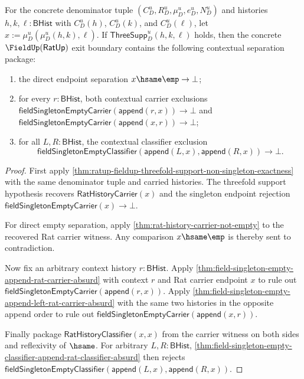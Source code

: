 \begin{theorem}
\label{thm:ratup-fieldup-threefold-support-contextual-separation-package}
For the concrete denominator tuple $(C_D^u,R_D^u,\mu_D^u,e_D^u,N_D^u)$ and
histories $h,k,\ell:\mathsf{BHist}$ with $C_D^u(h)$, $C_D^u(k)$, and
$C_D^u(\ell)$, let $x:=\mu_D^u(\mu_D^u(h,k),\ell)$. If
$\mathsf{ThreeSupp}_D^u(h,k,\ell)$ holds, then the concrete
$\FieldUp(\mathsf{RatUp})$ exit boundary contains the following contextual
separation package:
\begin{enumerate}
  \item the direct endpoint separation $x\hsame\emp\to\bot$;
  \item for every $r:\mathsf{BHist}$, both contextual carrier exclusions
  $\mathsf{fieldSingletonEmptyCarrier}(\mathsf{append}(r,x))\to\bot$ and
  $\mathsf{fieldSingletonEmptyCarrier}(\mathsf{append}(x,r))\to\bot$;
  \item for all $L,R:\mathsf{BHist}$, the contextual classifier exclusion
  $$
  \mathsf{fieldSingletonEmptyClassifier}(\mathsf{append}(L,x),\mathsf{append}(R,x))
  \to\bot.
  $$
\end{enumerate}
\end{theorem}
\begin{proof}
First apply
\autoref{thm:ratup-fieldup-threefold-support-non-singleton-exactness} with the
same denominator tuple and carried histories. The threefold support hypothesis
recovers $\mathsf{RatHistoryCarrier}(x)$ and the singleton endpoint rejection
$\mathsf{fieldSingletonEmptyCarrier}(x)\to\bot$.

For direct empty separation, apply \autoref{thm:rat-history-carrier-not-empty} to
the recovered Rat carrier witness. Any comparison $x\hsame\emp$ is thereby sent
to contradiction.

Now fix an arbitrary context history $r:\mathsf{BHist}$. Apply
\autoref{thm:field-singleton-empty-append-rat-carrier-absurd} with context $r$
and Rat carrier endpoint $x$ to rule out
$\mathsf{fieldSingletonEmptyCarrier}(\mathsf{append}(r,x))$. Apply
\autoref{thm:field-singleton-empty-append-left-rat-carrier-absurd} with the same
two histories in the opposite append order to rule out
$\mathsf{fieldSingletonEmptyCarrier}(\mathsf{append}(x,r))$.

Finally package $\mathsf{RatHistoryClassifier}(x,x)$ from the carrier witness on
both sides and reflexivity of $\hsame$. For arbitrary $L,R:\mathsf{BHist}$,
\autoref{thm:field-singleton-empty-classifier-append-rat-classifier-absurd}
then rejects
$\mathsf{fieldSingletonEmptyClassifier}(\mathsf{append}(L,x),\mathsf{append}(R,x))$.
\end{proof}

